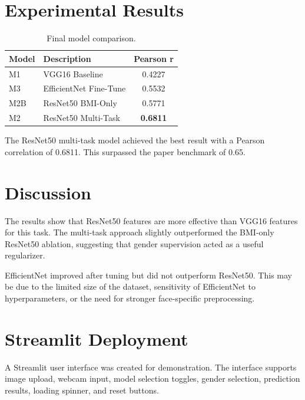 \documentclass[11pt]{article}
\begin{document}
\section{Experimental Results}

\begin{table}[H]
\centering
\begin{tabular}{llc}
\toprule
\textbf{Model} & \textbf{Description} & \textbf{Pearson r} \\
\midrule
M1 & VGG16 Baseline & 0.4227 \\
M3 & EfficientNet Fine-Tune & 0.5532 \\
M2B & ResNet50 BMI-Only & 0.5771 \\
M2 & ResNet50 Multi-Task & \textbf{0.6811} \\
\bottomrule
\end{tabular}
\caption{Final model comparison.}
\end{table}

The ResNet50 multi-task model achieved the best result with a Pearson correlation of 0.6811. This surpassed the paper benchmark of 0.65.

\section{Discussion}

The results show that ResNet50 features are more effective than VGG16 features for this task. The multi-task approach slightly outperformed the BMI-only ResNet50 ablation, suggesting that gender supervision acted as a useful regularizer.

EfficientNet improved after tuning but did not outperform ResNet50. This may be due to the limited size of the dataset, sensitivity of EfficientNet to hyperparameters, or the need for stronger face-specific preprocessing.

\section{Streamlit Deployment}

A Streamlit user interface was created for demonstration. The interface supports image upload, webcam input, model selection toggles, gender selection, prediction results, loading spinner, and reset buttons.
\end{document}
